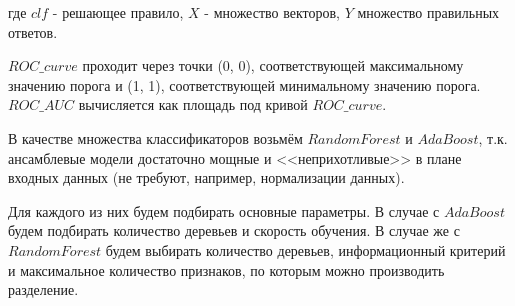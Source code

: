 \documentclass[a4paper,14pt]{extreport} %
\begin{document}
где $clf$ - решающее правило, $X$ - множество векторов, $Y$ множество правильных ответов.
	
$ROC\_curve$ проходит через точки (0, 0), соответствующей максимальному значению порога и (1, 1), соответствующей минимальному значению порога.
$ROC\_AUC$ вычисляется как площадь под кривой $ROC\_curve$.
	
В качестве множества классификаторов возьмём $RandomForest$ и $AdaBoost$, т.к. ансамблевые модели достаточно мощные и <<неприхотливые>> в плане входных данных (не требуют, например, нормализации данных).
	
Для каждого из них будем подбирать основные параметры. В случае с $AdaBoost$ будем подбирать количество деревьев и скорость обучения. В случае же с $RandomForest$ будем выбирать количество деревьев, информационный критерий и максимальное количество признаков, по которым можно производить разделение.
	 
	 
\end{document}

